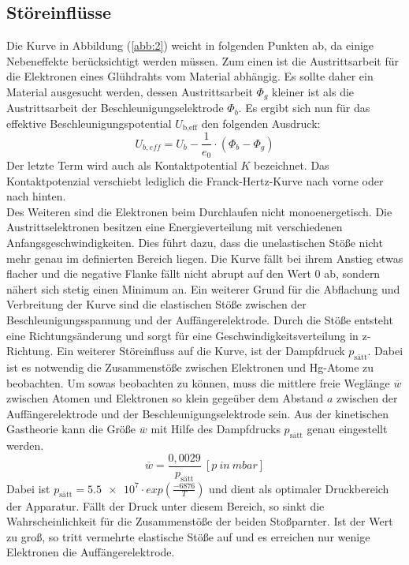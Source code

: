 \subsection{Störeinflüsse}
Die Kurve in Abbildung (\ref{abb:2}) weicht in folgenden Punkten ab, da einige Nebeneffekte berücksichtigt werden müssen.
Zum einen ist die Austrittsarbeit für die Elektronen eines Glühdrahts vom Material abhängig.
Es sollte daher ein Material ausgesucht werden, dessen Austrittsarbeit $\Phi_g$ kleiner ist als die
Austrittsarbeit der Beschleunigungselektrode $\Phi_b$.
Es ergibt sich nun für das effektive Beschleunigungspotential $U_\text{b,eff}$ den folgenden Ausdruck:
\begin{equation}
  U_{b,eff} = U_b - \frac{1}{e_0} \cdot (\Phi_b - \Phi_g)
  \label{eq:5}
\end{equation}
Der letzte Term wird auch als Kontaktpotential $K$ bezeichnet.
Das Kontaktpotenzial verschiebt lediglich die Franck-Hertz-Kurve nach vorne oder nach hinten.\\
Des Weiteren sind die Elektronen beim Durchlaufen nicht monoenergetisch.
Die Austrittselektronen besitzen eine Energieverteilung mit verschiedenen Anfangsgeschwindigkeiten.
Dies führt dazu, dass die unelastischen Stöße nicht mehr genau im definierten Bereich liegen.
Die Kurve fällt bei ihrem Anstieg etwas flacher und die negative Flanke fällt nicht abrupt auf den Wert 0 ab, sondern nähert sich stetig einen Minimum an.
Ein weiterer Grund für die Abflachung und Verbreitung der Kurve sind die elastischen Stöße zwischen der Beschleunigungsspannung
und der Auffängerelektrode. Durch die Stöße entsteht eine Richtungsänderung und sorgt für eine Geschwindigkeitsverteilung in
z-Richtung.
Ein weiterer Störeinfluss auf die Kurve, ist der Dampfdruck $p_\text{sätt}$. Dabei ist es notwendig die
Zusammenstöße zwischen Elektronen und Hg-Atome zu beobachten. Um sowas beobachten zu können,
muss die mittlere freie Weglänge $\overline{w}$ zwischen Atomen und Elektronen so klein gegeüber dem Abstand $a$ zwischen der Auffängerelektrode und der Beschleunigungselektrode
sein.
Aus der kinetischen Gastheorie kann die Größe $\overline{w}$ mit Hilfe des Dampfdrucks $p_\text{sätt}$
genau eingestellt werden.
\begin{equation}
  \overline{w} = \frac{0,0029}{p_\text{sätt}} \ [p \ in \ mbar]
  \label{eq:6}
\end{equation}
Dabei ist $p_\text{sätt} = \num{5,5e7} \cdot exp(\frac{-6876}{T})$ und dient als optimaler Druckbereich der Apparatur.
Fällt der Druck unter diesem Bereich,
so sinkt die Wahrscheinlichkeit für die Zusammenstöße der beiden Stoßparnter. Ist der Wert zu groß, so tritt
vermehrte elastische Stöße auf und es erreichen nur wenige Elektronen die Auffängerelektrode.
